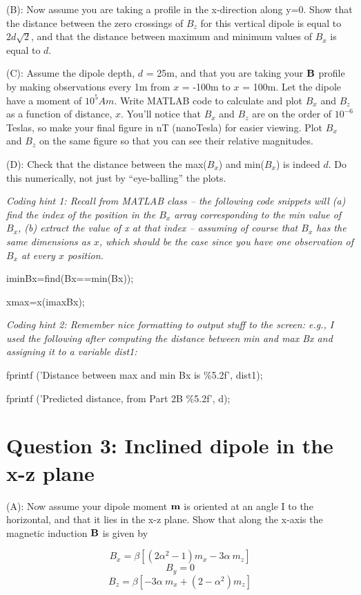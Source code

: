 (B):  Now assume you are taking a profile in the x-direction along y=0.
Show that the distance between the zero crossings of $B_z$ for this vertical dipole is equal to $2 d \sqrt 2$, and that the distance between 
maximum and minimum values of $B_x$ is equal to $d$.  

(C):  Assume the dipole depth, $d$ = 25m, and that you are taking your ${\bf B}$ profile by making observations every 1m from $x$ = -100m to
$x$ = 100m.  Let the dipole have a moment of $10^5 A m$.   Write MATLAB code to calculate and plot $B_x$ and $B_z$ as a function of distance, $x$.
You'll notice that $B_x$ and $B_z$ are on the order of $10^{-6}$ Teslas, so make your final figure in nT (nanoTesla) for easier viewing.  Plot $B_x$ and $B_z$ on the same figure so that you can see their relative magnitudes.  

(D):  Check that the distance between the max($B_x$) and min($B_x$) is indeed $d$.  Do this numerically, not just by ``eye-balling'' the plots.  

{\it Coding hint 1:  Recall from MATLAB class -- the following code snippets will (a) find the index of the position in the $B_x$ array corresponding to the min value of $B_x$, (b) extract the value of x at that index -- assuming of course that $B_x$ has the same dimensions as $x$, which should be the case since you have one observation of $B_x$ at every $x$ position.}

iminBx=find(Bx==min(Bx)); 

xmax=x(imaxBx);

{\it Coding hint 2:  Remember nice formatting to output stuff to the screen:  e.g., I used the following after computing the distance between min and max Bx and assigning it to a variable dist1:} 

fprintf ('Distance between max and min Bx is \%5.2f', dist1); 

fprintf ('Predicted distance, from Part 2B \%5.2f', d);

\section {Question 3:  Inclined dipole in the x-z plane}  

(A):  Now assume your dipole moment ${\bf m}$ is oriented at an angle I to the horizontal, and that it lies in the x-z plane.  Show that along the x-axis the magnetic induction ${\bf B}$
is given by 

$$ B_x = \beta \left [ \left ( 2 \alpha^2 - 1 \right ) m_x - 3 \alpha\ m_z  \right ] $$
$$ B_y = 0 $$
$$ B_z = \beta \left [ -3 \alpha\ m_x +  \left ( 2 - \alpha^2 \right ) m_z \right ] $$

